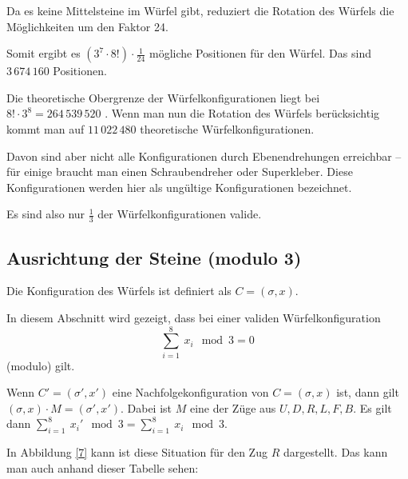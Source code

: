 \documentclass[12pt,a4paper, usenames, dvipsnames]{article}
\begin{document}
Da es keine Mittelsteine im Würfel gibt, reduziert die Rotation des Würfels die Möglichkeiten um den Faktor 24. 


Somit ergibt es $(3^7 \cdot 8!) \cdot \frac{1}{24}$ mögliche Positionen für den Würfel. Das sind $3\, 674\, 160$ Positionen.


Die theoretische Obergrenze der Würfelkonfigurationen liegt bei $8! \cdot 3^8 = 264 \, 539 \, 520$ \cite{MMFAA}. Wenn man nun die Rotation des Würfels berücksichtig kommt man auf $11 \, 022 \, 480$ theoretische Würfelkonfigurationen.


Davon sind aber nicht alle Konfigurationen durch Ebenendrehungen erreichbar -- für einige braucht man einen Schraubendreher oder Superkleber. Diese Konfigurationen werden hier als ungültige Konfigurationen bezeichnet. 


Es sind also nur $\frac{1}{3}$ der Würfelkonfigurationen valide.
%
%
%
%
%
%
%
%
%
%
%
%
%
%
%
%
%
%
%
%
\subsection*{Ausrichtung der Steine (modulo 3)}

Die Konfiguration des Würfels ist definiert als $C=(\sigma, x)$. 


In diesem Abschnitt wird gezeigt, dass bei einer validen Würfelkonfiguration \begin{displaymath}
\sum_{i= 1}^{8} \ x_i \mod 3 = 0 
\end{displaymath}  (modulo) gilt. 


Wenn $C'=(\sigma', x')$ eine Nachfolgekonfiguration von $C=(\sigma, x)$ ist, dann gilt  ${(\sigma, x) \cdot M = (\sigma', x')}$. Dabei ist $M$ eine der Züge aus $U, D, R, L, F, B$. Es gilt dann ${\sum_{i= 1}^{8} \ x_i' \mod 3 = \sum_{i= 1}^{8} \  x_i \mod 3 }$.

In Abbildung \ref{7} kann ist diese Situation für den Zug $R$ dargestellt. Das kann man auch anhand dieser Tabelle sehen: 
\end{document}
